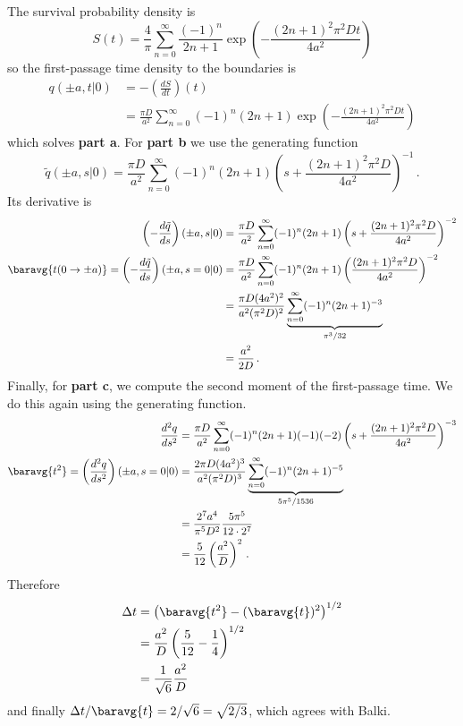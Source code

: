 The survival probability density is
\begin{equation*}
  S(t) = \frac{4}{\pi} \sum_{n=0}^\infty \frac{(-1)^n}{2n + 1} \exp \left(
    - \frac{(2n + 1)^2 \pi^2 D t}{4 a ^2}
  \right)
\end{equation*}
so the first-passage time density to the boundaries is
\begin{align*}
  q(\pm a, t | 0)
  &= - \left( \frac{dS}{dt} \right)(t) \\
  &= \frac{\pi D}{a^2} \sum_{n=0}^\infty (-1)^n (2 n + 1) \exp \left(
    - \frac{(2n + 1)^2 \pi^2 D t}{4 a ^2}
  \right)
\end{align*}
which solves \textbf{part a}.
For \textbf{part b} we use the generating function
\begin{equation*}
  \tilde{q}(\pm a, s | 0)
  = \frac{\pi D}{a^2} \sum_{n=0}^\infty (-1)^n (2n + 1) \left( s + \frac{(2n + 1)^2 \pi^2 D}{4 a^2} \right)^{-1}
  \, .
\end{equation*}
Its derivative is
\begin{align*}
  \left(- \frac{d \tilde{q}}{ds} \right)(\pm a, s | 0)
  &= \frac{\pi D}{a^2} \sum_{n=0}^\infty (-1)^n (2n + 1)
    \left( s + \frac{(2n + 1)^2 \pi^2 D}{4 a^2} \right)^{-2} \\
  \baravg{t(0 \rightarrow \pm a)} = \left(- \frac{d \tilde{q}}{ds} \right)(\pm a, s=0 | 0)
  &= \frac{\pi D}{a^2} \sum_{n=0}^\infty (-1)^n (2n + 1)
    \left( \frac{(2n + 1)^2 \pi^2 D}{4 a^2} \right)^{-2} \\
  &= \frac{\pi D (4a^2)^2}{a^2 (\pi^2 D)^2} \underbrace{\sum_{n=0}^\infty (-1)^n (2n + 1)^{-3}}_{\pi^3 / 32} \\
  &= \frac{a^2}{2 D}
  \, .
\end{align*}
Finally, for \textbf{part c}, we compute the second moment of the first-passage time.
We do this again using the generating function.
\begin{align*}
  \frac{d^2 q}{ds^2}
  &= \frac{\pi D}{a^2} \sum_{n=0}^\infty (-1)^n (2n + 1) (-1)(-2)
    \left( s + \frac{(2n + 1)^2 \pi^2 D}{4 a^2} \right)^{-3} \\
  \baravg{t^2}
  = \left( \frac{d^2 q}{ds^2} \right)(\pm a, s=0 | 0)
  &= \frac{2 \pi D (4a^2)^3}{a^2 (\pi^2 D)^3} \underbrace{\sum_{n=0}^\infty (-1)^n (2n + 1)^{-5}}_{5 \pi^5 / 1536} \\
  &= \frac{2^7 a^4}{\pi^5 D^2} \frac{5 \pi^5}{12 \cdot 2^7} \\
  &= \frac{5}{12} \left( \frac{a^2}{D} \right)^2
  \, .
\end{align*}
Therefore
\begin{align*}
  \Delta t
  &= \left( \baravg{t^2} - (\baravg{t})^2 \right)^{1/2} \\
  &= \frac{a^2}{D} \left( \frac{5}{12} - \frac{1}{4} \right)^{1/2} \\
  &= \frac{1}{\sqrt{6}} \frac{a^2}{D}
\end{align*}
and finally $\Delta t / \baravg{t} = 2 / \sqrt{6} = \sqrt{2 / 3}$, which agrees with Balki.
